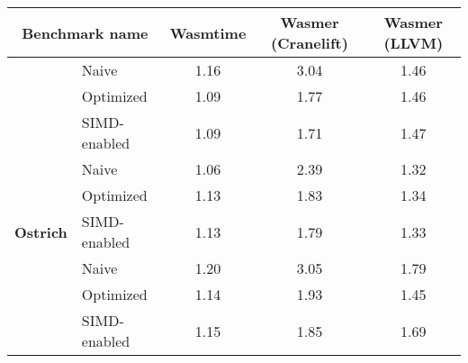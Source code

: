 
\begin{tabular}{ll|ccc}
    \multicolumn{2}{c|}{\textbf{Benchmark name}}                 & \textbf{Wasmtime}                   & \textbf{Wasmer (Cranelift)} & \textbf{Wasmer (LLVM)}                                    \\ \hline
    \rowcolor[HTML]{C0C0C0}
    \cellcolor[HTML]{C0C0C0}                                     & Naive                               & 1.16                        & 3.04                        & 1.46                        \\
    \rowcolor[HTML]{C0C0C0}
    \cellcolor[HTML]{C0C0C0}                                     & Optimized                           & 1.09                        & 1.77                        & 1.46                        \\
    \rowcolor[HTML]{C0C0C0}
    \multirow{-3}{*}{\cellcolor[HTML]{C0C0C0}\textbf{Polybench}} & SIMD-enabled                        & 1.09                        & 1.71                        & 1.47                        \\ \hline
                                                                 & Naive                               & 1.06                        & 2.39                        & 1.32                        \\
                                                                 & Optimized                           & 1.13                        & 1.83                        & 1.34                        \\
    \multirow{-3}{*}{\textbf{Ostrich}}                           & SIMD-enabled                        & 1.13                        & 1.79                        & 1.33                        \\ \hline
    \rowcolor[HTML]{C0C0C0}
    \cellcolor[HTML]{C0C0C0}                                     & {\color[HTML]{333333} Naive}        & {\color[HTML]{333333} 1.20} & {\color[HTML]{333333} 3.05} & {\color[HTML]{333333} 1.79} \\
    \rowcolor[HTML]{C0C0C0}
    \cellcolor[HTML]{C0C0C0}                                     & {\color[HTML]{333333} Optimized}    & {\color[HTML]{333333} 1.14} & {\color[HTML]{333333} 1.93} & {\color[HTML]{333333} 1.45} \\
    \rowcolor[HTML]{C0C0C0}
    \multirow{-3}{*}{\cellcolor[HTML]{C0C0C0}\textbf{NPB}}       & {\color[HTML]{333333} SIMD-enabled} & {\color[HTML]{333333} 1.15} & {\color[HTML]{333333} 1.85} & {\color[HTML]{333333} 1.69}
\end{tabular}
